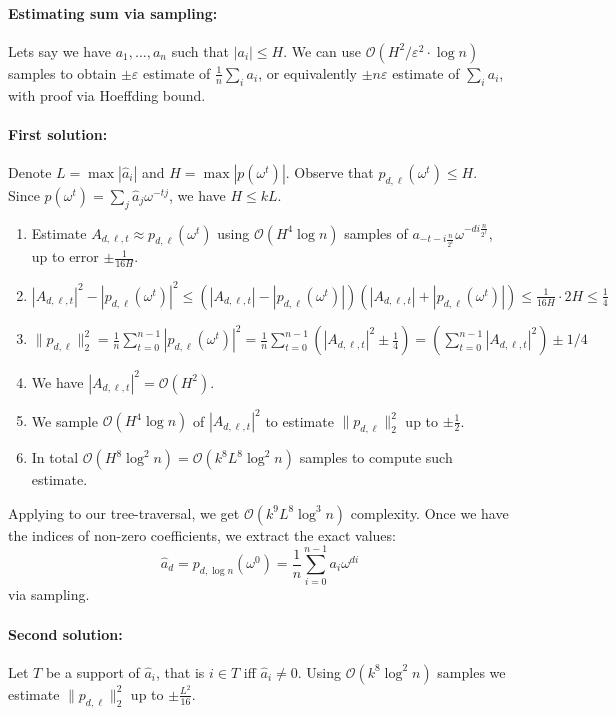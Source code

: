 \documentclass[11pt]{article}
\newcommand{\bigo}{\mathcal{O}}
\begin{document}
\paragraph{Estimating sum via sampling:}
Lets say we have $a_1, \ldots, a_n$ such that $|a_i| \le H$.  We can use $\bigo(H^2/\varepsilon^2 \cdot \log n)$ samples to obtain $\pm \varepsilon$ estimate of  $\frac{1}{n}\sum_i a_i$, or equivalently $\pm n \varepsilon$ estimate of $\sum_i a_i$, with proof via Hoeffding bound.


\paragraph{First solution:}
Denote $L = \max |\hat{a}_i|$ and $H = \max |p(\omega^t)|$. Observe that $p_{d,\ell}(\omega^t) \le H$. Since $p(\omega^t) = \sum_j \hat{a}_j \omega^{-tj}$, we have $H \le kL$.
\begin{enumerate}
\item Estimate $A_{d,\ell,t} \approx p_{d,\ell}(\omega^t)$ using $\bigo(H^4 \log n)$ samples of $a_{-t - i\frac{n}{2^\ell}} \omega^{-d i \frac{n}{2^\ell}}$, up to error $\pm \frac{1}{16H}$.
\item $|A_{d,\ell,t}|^2 - |p_{d,\ell}(\omega^t)|^2 \le  (|A_{d,\ell,t}| - |p_{d,\ell}(\omega^t)|)(|A_{d,\ell,t}| + |p_{d,\ell}(\omega^t)|) \le \frac{1}{16H} \cdot 2H \le \frac{1}{4}$
\item $\|p_{d,\ell}\|_2^2 = \frac{1}{n}\sum_{t=0}^{n-1}|p_{d,\ell}(\omega^t)|^2 = \frac{1}{n} \sum_{t=0}^{n-1} (|A_{d,\ell,t}|^2 \pm \frac{1}{4}) =  (\sum_{t=0}^{n-1} |A_{d,\ell,t}|^2) \pm 1/4$
\item We have $|A_{d,\ell,t}|^2 = \bigo(H^2)$.
\item We sample $\bigo(H^4 \log n)$ of $|A_{d,\ell,t}|^2$ to estimate $\|p_{d,\ell}\|_2^2$ up to $\pm \frac{1}{2}$.
\item In total $\bigo(H^8 \log^2 n) = \bigo(k^8 L^8 \log^2 n)$ samples to compute such estimate.
\end{enumerate}

Applying to our tree-traversal, we get $\bigo(k^9 L^8 \log^3 n)$ complexity. Once we have the indices of non-zero coefficients, we extract the exact values:
$$\hat{a}_d = p_{d,\log n}(\omega^0) = \frac{1}{n} \sum_{i=0}^{n-1} a_{i}\omega^{di}$$
via sampling.

\paragraph{Second solution:}
Let $T$ be a support of $\hat{a}_i$, that is $i \in T$ iff $\hat{a}_i \not= 0$.
Using $\bigo(k^8 \log^2 n)$ samples we  estimate $\|p_{d,\ell}\|_2^2$ up to $\pm \frac{L^2}{16}$.
\end{document}
